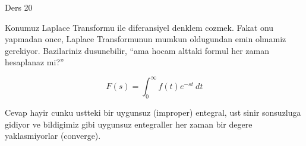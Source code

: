 \documentclass[12pt,fleqn]{article}
\begin{document}
Ders 20

Konumuz Laplace Transformu ile diferansiyel denklem cozmek. Fakat onu
yapmadan once, Laplace Transformunun mumkun oldugundan emin olmamiz
gerekiyor. Bazilariniz dusunebilir, ``ama hocam alttaki formul her zaman
hesaplanaz mi?''

\[ F(s) = \int_0^{\infty} f(t)e^{-st} \ dt \]

Cevap hayir cunku ustteki bir uygunsuz (improper) entegral, ust sinir
sonsuzluga gidiyor ve bildigimiz gibi uygunsuz entegraller her zaman bir
degere yaklasmiyorlar (converge). 
\end{document}
